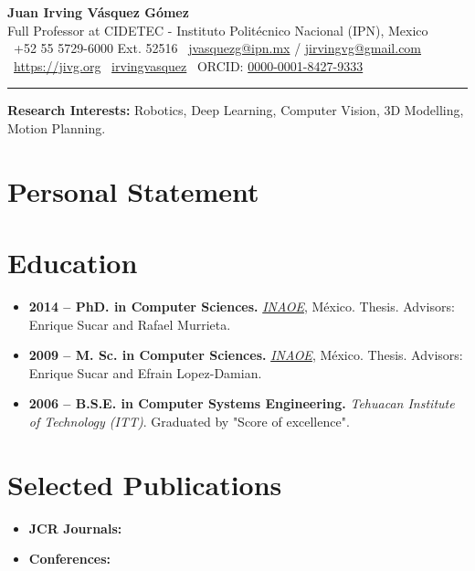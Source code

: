 \documentclass[10pt,letterpaper]{article}
\begin{document}
	
	\begin{center}
		{\huge \textbf{Juan Irving Vásquez Gómez}} \\
		\vspace{2pt}
		\small
		Full Professor at CIDETEC - Instituto Politécnico Nacional (IPN), Mexico \\
		\faPhone \ +52 55 5729-6000 Ext. 52516 \quad 
		\faEnvelopeO \ \href{mailto:jvasquezg@ipn.mx}{jvasquezg@ipn.mx} / \href{mailto:jirvingvg@gmail.com}{jirvingvg@gmail.com} \\
		\faExternalLink \ \url{https://jivg.org} \quad
		\faGithub \ \href{https://github.com/irvingvasquez}{irvingvasquez} \quad
		\faBarChart \ ORCID: \href{https://orcid.org/0000-0001-8427-9333}{0000-0001-8427-9333}
	\end{center}
	
	\vspace{-10pt}
	\hrule
	\vspace{5pt}
	
	\textbf{Research Interests:} Robotics, Deep Learning, Computer Vision, 3D Modelling, Motion Planning.
	
	\section*{Personal Statement}
	\vspace{-5pt}
	
	
	\section*{Education}
	\vspace{-5pt}
	\begin{itemize}
		\item \textbf{2014 -- PhD. in Computer Sciences.} \href{https://www.inaoep.mx/}{\textit{INAOE}}, México. Thesis. Advisors: Enrique Sucar and Rafael Murrieta.
		\item \textbf{2009 -- M. Sc. in Computer Sciences.} \href{https://www.inaoep.mx/}{\textit{INAOE}}, México. Thesis. Advisors: Enrique Sucar and Efrain Lopez-Damian.
		\item \textbf{2006 -- B.S.E. in Computer Systems Engineering.} \textit{Tehuacan Institute of Technology (ITT)}. Graduated by "Score of excellence".
	\end{itemize}
	
	\section*{Selected Publications}
	\vspace{-5pt}
	\begin{itemize}
		\item \textbf{JCR Journals:} 
		\item \textbf{Conferences:} 
	\end{itemize}
	
\end{document}
